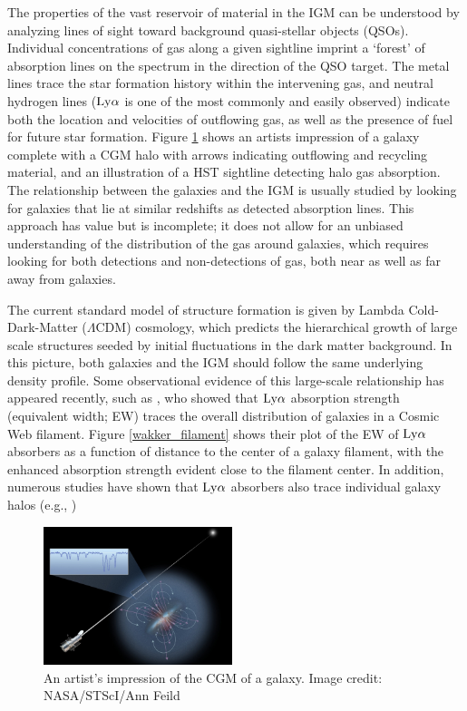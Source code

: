 \documentclass[twocolumn,tighten]{aastex62}
\begin{document}
The properties of the vast reservoir of material in the IGM can be understood by analyzing lines of sight toward background quasi-stellar objects (QSOs). Individual concentrations of gas along a given sightline imprint a `forest' of absorption lines on the spectrum in the direction of the QSO target. The metal lines trace the star formation history within the intervening gas, and neutral hydrogen lines ($\rm Ly\alpha$ is one of the most commonly and easily observed) indicate both the location and velocities of outflowing gas, as well as the presence of fuel for future star formation. Figure \ref{cgm_artist} shows an artists impression of a galaxy complete with a CGM halo with arrows indicating outflowing and recycling material, and an illustration of a HST sightline detecting halo gas absorption. The relationship between the galaxies and the IGM is usually studied by looking for galaxies that lie at similar redshifts as detected absorption lines. This approach has value but is incomplete; it does not allow for an unbiased understanding of the distribution of the gas around galaxies, which requires looking for both detections and non-detections of gas, both near as well as far away from galaxies.

The current standard model of structure formation is given by Lambda Cold-Dark-Matter ($\Lambda$CDM) cosmology, which predicts the hierarchical growth of large scale structures seeded by initial fluctuations in the dark matter background. In this picture, both galaxies and the IGM should follow the same underlying density profile. Some observational evidence of this large-scale relationship has appeared recently, such as \cite{wakker2015}, who showed that $\rm Ly\alpha$ absorption strength (equivalent width; EW) traces the overall distribution of galaxies in a Cosmic Web filament. Figure \ref{wakker_filament} shows their plot of the EW of $\rm Ly\alpha$ absorbers as a function of distance to the center of a galaxy filament, with the enhanced absorption strength evident close to the filament center. In addition, numerous studies have shown that $\rm Ly\alpha$ absorbers also trace individual galaxy halos (e.g., \citealt{lanzetta1995, chen1998, chen2001a,  tripp1998, bowen2002, cote2005, wakker2009, steidel2010, prochaska2011, thom2012, stocke2013, liang2014, danforth2016})


\begin{figure}[ht!]
        \centering
        \vspace{0pt}
        \includegraphics[width=0.49\textwidth]{hubble_cgm.jpg}
        \caption{\small{An artist's impression of the CGM of a galaxy. Image credit: NASA/STScI/Ann Feild}}
        \vspace{5pt}
        \label{cgm_artist}
\end{figure}
\end{document}
